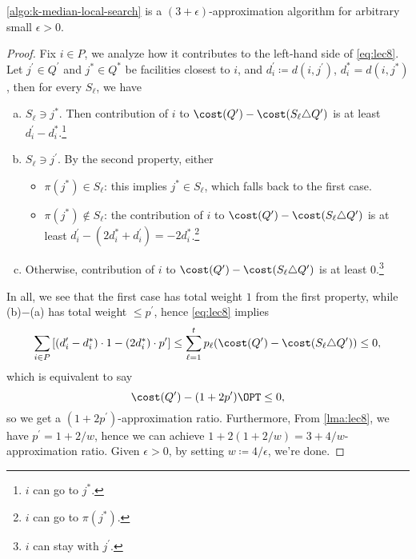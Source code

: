 \begin{theorem}\label{thm:lec8}
	\autoref{algo:k-median-local-search} is a \((3 + \epsilon)\)-approximation algorithm for arbitrary small \(\epsilon > 0\).
\end{theorem}
\begin{proof}
	Fix \(i\in P\), we analyze how it contributes to the left-hand side of \autoref{eq:lec8}. Let \(j^\prime \in Q^\prime \) and \(j^{\ast} \in Q^{\ast} \) be facilities closest to \(i\), and \(d_i^\prime \coloneqq d(i, j^\prime )\), \(d_i^{\ast} = d(i, j^{\ast} )\), then for every \(S_{\ell}\), we have
	\begin{enumerate}[(a)]
		\item \(S_{\ell }\ni j^{\ast} \). Then contribution of \(i\) to \(\cost(Q^\prime ) - \cost(S_{\ell }\triangle Q^\prime)\) is at least \(d_i^\prime - d_i^{\ast}\).\footnote{\(i\) can go to \(j^{\ast} \).}
		\item \(S_{\ell }\ni j^\prime\). By the second property, either
		      \begin{itemize}
			      \item \(\pi (j^{\ast} )\in S_{\ell } \): this implies \(j^{\ast}\in S_{\ell }\), which falls back to the first case.
			      \item \(\pi (j^{\ast} )\notin S_{\ell } \): the contribution of \(i\) to \(\cost(Q^\prime ) - \cost(S_{\ell }\triangle Q^\prime)\) is at least \(d_i^\prime - (2d_i^{\ast} + d_i^\prime ) = -2d_i^{\ast}\).\footnote{\(i\) can go to \(\pi (j^{\ast} )\).}
		      \end{itemize}
		\item Otherwise, contribution of \(i\) to \(\cost(Q^\prime ) - \cost(S_{\ell }\triangle Q^\prime)\) is at least \(0\).\footnote{\(i\) can stay with \(j^\prime \).}
	\end{enumerate}

	In all, we see that the first case has total weight \(1\) from the first property, while (b)\(-\)(a) has total weight \(\leq p^\prime \), hence \autoref{eq:lec8} implies
	\[
		\sum_{i\in P} \left[ (d_i^\prime - d_i^{\ast} )\cdot 1 - (2d_i^{\ast} )\cdot p^\prime \right] \leq \sum_{\ell =1} ^t p_{\ell } (\cost(Q^\prime ) - \cost(S_{\ell }\triangle Q^\prime)) \leq 0,
	\]
	which is equivalent to say
	\[
		\cost(Q^\prime ) - (1 + 2p^\prime )\OPT \leq 0,
	\]
	so we get a \((1 + 2p^\prime )\)-approximation ratio. Furthermore, From \autoref{lma:lec8}, we have \(p^\prime = 1 + 2 / w\), hence we can achieve \(1 + 2(1 + 2 / w) = 3 + 4 / w\)-approximation ratio. Given \(\epsilon > 0\), by setting \(w \coloneqq 4/\epsilon \), we're done.
\end{proof}
